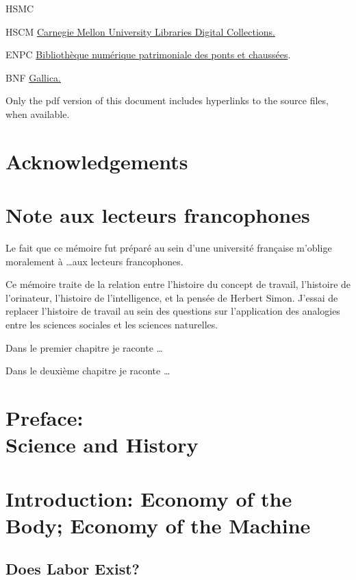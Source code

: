 \documentclass[version=last,draft=true,paper=A4,portrait,twoside=true,twocolumn=false,headinclude=false,footinclude=false,fontsize=12,BCOR=20mm,DIV=calc,pagesize=auto,titlepage=firstiscover,mpinclude=true,open=right,chapterprefix=true,numbers=autoendperiod,headsepline=false,parskip=false]{scrbook}
\begin{document}
\begin{labeling}[:]{HSMC} 
\item[HSCM] \href{https://digitalcollections.library.cmu.edu/portal/index.jsp}{Carnegie Mellon University Libraries Digital Collections.} 
\item[ENPC] \href{https://patrimoine.enpc.fr/}{Bibliothèque numérique patrimoniale des ponts et chaussées}.
\item[BNF] \href{https://gallica.bnf.fr/}{Gallica.}
\end{labeling}

Only the pdf version of this document includes hyperlinks to the source
files, when available.

\chapter{Acknowledgements} 
\lipsum
\chapter{Note aux lecteurs francophones} 
Le fait que ce mémoire fut préparé au sein d'une université française
m'oblige moralement à \ldots aux lecteurs francophones. 

Ce mémoire traite de la relation entre l'histoire du concept de travail,
l'histoire de l'orinateur, l'histoire de l'intelligence, et la pensée de
Herbert Simon. J'essai de replacer l'histoire de travail au sein des
questions sur  l'application des analogies entre les sciences sociales et
les sciences naturelles.  

Dans le premier chapitre je raconte \ldots 

Dans le deuxième chapitre je raconte \ldots 

\lipsum

\chapter[Preface]{Preface:\\ Science and History} 

\lipsum
\mainmatter
\pagestyle{scrheadings}
\chapter{Introduction: Economy of the Body; Economy of the Machine}
\label{sec:orgfd1c8b9}
\section{Does Labor Exist?}
\label{sec:org2c135c3}
\end{document}
